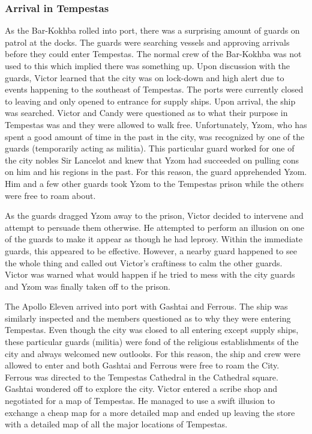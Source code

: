 \subsubsection{Arrival in Tempestas}

As the Bar-Kokhba rolled into port, there was a surprising amount of guards on patrol at the docks. The guards were searching vessels and approving arrivals before they could enter Tempestas. The normal crew of the Bar-Kokhba was not used to this which implied there was something up. Upon discussion with the guards, Victor learned that the city was on lock-down and high alert due to events happening to the southeast of Tempestas. The ports were currently closed to leaving and only opened to entrance for supply ships. Upon arrival, the ship was searched. Victor and Candy were questioned as to what their purpose in Tempestas was and they were allowed to walk free. Unfortunately, Yzom, who has spent a good amount of time in the past in the city, was recognized by one of the guards (temporarily acting as militia). This particular guard worked for one of the city nobles Sir Lancelot and knew that Yzom had succeeded on pulling cons on him and his regions in the past. For this reason, the guard apprehended Yzom. Him and a few other guards took Yzom to the Tempestas prison while the others were free to roam about.

As the guards dragged Yzom away to the prison, Victor decided to intervene and attempt to persuade them otherwise. He attempted to perform an illusion on one of the guards to make it appear as though he had leprosy. Within the immediate guards, this appeared to be effective. However, a nearby guard happened to see the whole thing and called out Victor's craftiness to calm the other guards. Victor was warned what would happen if he tried to mess with the city guards and Yzom was finally taken off to the prison.

The Apollo Eleven arrived into port with Gashtai and Ferrous. The ship was similarly inspected and the members questioned as to why they were entering Tempestas. Even though the city was closed to all entering except supply ships, these particular guards (militia) were fond of the religious establishments of the city and always welcomed new outlooks. For this reason, the ship and crew were allowed to enter and both Gashtai and Ferrous were free to roam the City. Ferrous was directed to the Tempestas Cathedral in the Cathedral square. Gashtai wondered off to explore the city. Victor entered a scribe shop and negotiated for a map of Tempestas. He managed to use a swift illusion to exchange a cheap map for a more detailed map and ended up leaving the store with a detailed map of all the major locations of Tempestas.

